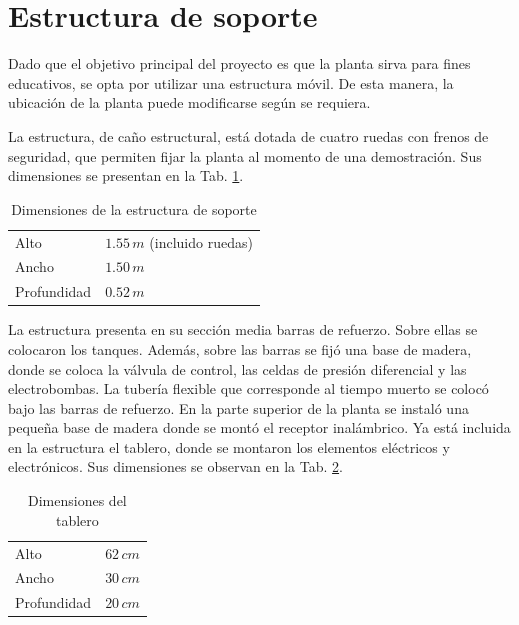 \section{Estructura de soporte}
\label{sec:EstructuraSoporte}

Dado que el objetivo principal del proyecto es que la planta sirva para fines
educativos, se opta por utilizar una estructura móvil.
De esta manera, la ubicación de la planta puede modificarse según se requiera.

La estructura, de caño estructural, está dotada de cuatro ruedas con frenos de
seguridad, que permiten fijar la
planta al momento de una demostración.
Sus dimensiones se presentan en la Tab. \ref{tab:dimensionesEstructura}.

\begin{table}[ht]
\renewcommand{\arraystretch}{1.3}
\centering
\begin{tabular}{|l|l|}
\hline
Alto & $1.55\,m$ (incluido ruedas)\\
Ancho &  $1.50\,m$\\
Profundidad &  $0.52\,m$\\
\hline
\end{tabular}
\caption{Dimensiones de la estructura de soporte}
\label{tab:dimensionesEstructura}
\end{table}
 
La estructura presenta en su sección media barras de refuerzo.
Sobre ellas se colocaron los tanques.
Además, sobre las barras se fijó una base de madera, donde se coloca la
válvula de control, las celdas de presión diferencial
y las electrobombas.
La tubería flexible que corresponde al tiempo muerto se colocó bajo
las barras de refuerzo.
En la parte superior de la planta se instaló una pequeña base de
madera donde se montó el receptor inalámbrico.
Ya está incluida en la estructura el tablero, donde se
montaron los elementos eléctricos y electrónicos.
Sus dimensiones se observan en la Tab. \ref{tab:dimensionesTablero}.

\begin{table}[h]
\renewcommand{\arraystretch}{1.3}
\centering
\begin{tabular}{|l|l|}
\hline
Alto & $62\,cm$\\
Ancho &  $30\,cm$\\
Profundidad &  $20\,cm$\\
\hline
\end{tabular}
\caption{Dimensiones del tablero}
\label{tab:dimensionesTablero}
\end{table}

